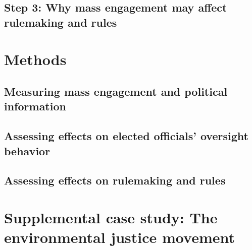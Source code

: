 \documentclass{article}
\begin{document}
\subsection{Step 3: Why mass engagement may affect rulemaking and rules} \label{influence-intro}




\section{Methods}

\subsection{Measuring mass engagement and political information}
\label{whyMail-methods}


\subsection{Assessing effects on elected officials' oversight behavior} \label{principals-methods}


\subsection{Assessing effects on rulemaking and rules}
\label{influence-methods}







\section{Supplemental case study: The environmental justice movement} \label{ej}

\end{document}
